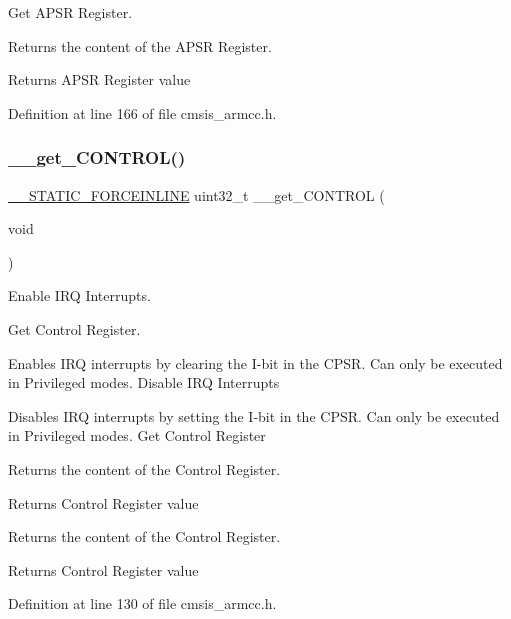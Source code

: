 Get A\+P\+SR Register. 

Returns the content of the A\+P\+SR Register. \begin{DoxyReturn}{Returns}
A\+P\+SR Register value 
\end{DoxyReturn}


Definition at line 166 of file cmsis\+\_\+armcc.\+h.

\mbox{\label{group___c_m_s_i_s___core___reg_acc_functions_ga7dd5c942bee32f055b90153feb950f59}} 
\subsubsection{\texorpdfstring{\+\_\+\+\_\+get\+\_\+\+C\+O\+N\+T\+R\+O\+L()}{\_\_get\_CONTROL()}}
{\footnotesize\ttfamily \hyperlink{cmsis__iccarm_8h_ab904513442afdf77d4f8c74f23cbb040}{\+\_\+\+\_\+\+S\+T\+A\+T\+I\+C\+\_\+\+F\+O\+R\+C\+E\+I\+N\+L\+I\+NE} uint32\+\_\+t \+\_\+\+\_\+get\+\_\+\+C\+O\+N\+T\+R\+OL (\begin{DoxyParamCaption}\item[{void}]{ }\end{DoxyParamCaption})}



Enable I\+RQ Interrupts. 

Get Control Register.

Enables I\+RQ interrupts by clearing the I-\/bit in the C\+P\+SR. Can only be executed in Privileged modes. Disable I\+RQ Interrupts

Disables I\+RQ interrupts by setting the I-\/bit in the C\+P\+SR. Can only be executed in Privileged modes. Get Control Register

Returns the content of the Control Register. \begin{DoxyReturn}{Returns}
Control Register value
\end{DoxyReturn}
Returns the content of the Control Register. \begin{DoxyReturn}{Returns}
Control Register value 
\end{DoxyReturn}


Definition at line 130 of file cmsis\+\_\+armcc.\+h.

